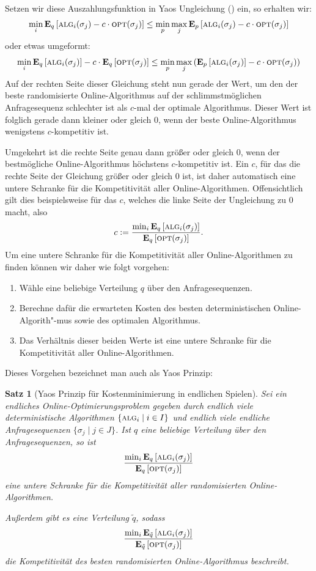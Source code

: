\documentclass[a4paper,ngerman,12pt,bibtotoc]{scrartcl}
\theoremstyle{definition}
\theoremstyle{plain}
\newtheorem{satz}[defn]{Satz}
\theoremstyle{remark}
\renewcommand{\_}{\mathpunct{.}\,}
\newcommand{\?}{\,{:}\,}
\newcommand{\Alg}{\ensuremath{\textsc{alg}}}
\newcommand{\Opt}{\ensuremath{\textsc{opt}}}
\newcommand{\EE}{\mathbf{E}}
\newcommand{\sq}{\tilde{q}}		%
\begin{document}
	Setzen wir diese Auszahlungsfunktion in Yaos Ungleichung () ein, so erhalten wir:
		\[\min_i\EE_q\left[\Alg_i(\sigma_j) - c\cdot\Opt(\sigma_j)\right] \leq \min_p\max_j\EE_{p}\left[\Alg_i(\sigma_j) - c\cdot\Opt(\sigma_j)\right]\]
	oder etwas umgeformt:
		\[\min_i\EE_q\left[\Alg_i(\sigma_j)\right] - c\cdot\EE_q\left[\Opt(\sigma_j)\right] \leq \min_p\max_j\left(\EE_{p}\left[\Alg_i(\sigma_j)\right] - c\cdot\Opt(\sigma_j)\right)\]
	Auf der rechten Seite dieser Gleichung steht nun gerade der Wert, um den der beste randomisierte Online-Algorithmus auf der schlimmstmöglichen Anfragesequenz schlechter ist als $c$-mal der optimale Algorithmus. Dieser Wert ist folglich gerade dann kleiner oder gleich 0, wenn der beste Online-Algorithmus wenigstens $c$-kompetitiv ist.
	
	Umgekehrt ist die rechte Seite genau dann größer oder gleich 0, wenn der bestmögliche Online-Algorithmus höchstens $c$-kompetitiv ist. Ein $c$, für das die rechte Seite der Gleichung größer oder gleich 0 ist, ist daher automatisch eine untere Schranke für die Kompetitivität aller Online-Algorithmen. Offensichtlich gilt dies beispielsweise für das $c$, welches die linke Seite der Ungleichung zu 0 macht, also
		\[c := \frac{\min_i\EE_q\left[\Alg_i(\sigma_j)\right]}{\EE_q\left[\Opt(\sigma_j)\right]}.\]
	Um eine untere Schranke für die Kompetitivität aller Online-Algorithmen zu finden können wir daher wie folgt vorgehen:
	\begin{enumerate}
		\item Wähle eine beliebige Verteilung $q$ über den Anfragesequenzen.
		\item Berechne dafür die erwarteten Kosten des besten deterministischen Online-Algorith"-mus sowie des optimalen Algorithmus.
		\item Das Verhältnis dieser beiden Werte ist eine untere Schranke für die Kompetitivität aller Online-Algorithmen.
	\end{enumerate}
	
	Dieses Vorgehen bezeichnet man auch als Yaos Prinzip:
	
	\begin{satz}[Yaos Prinzip für Kostenminimierung in endlichen Spielen]
		Sei ein endliches Online-Optimierungsproblem gegeben durch endlich viele deterministische Algorithmen $\{\Alg_i \mid i\in I\}$ und endlich viele endliche Anfragesequenzen $\{\sigma_j \mid j \in J\}$. Ist $q$ eine beliebige Verteilung über den Anfragesequenzen, so ist 
			\[\frac{\min_i\EE_q\left[\Alg_i(\sigma_j)\right]}{\EE_q\left[\Opt(\sigma_j)\right]}\]
		eine untere Schranke für die Kompetitivität aller randomisierten Online-Algorithmen.
		
		Außerdem gibt es eine Verteilung $\sq$, sodass 
			\[\frac{\min_i\EE_{\sq}\left[\Alg_i(\sigma_j)\right]}{\EE_{\sq}\left[\Opt(\sigma_j)\right]}\]
		die Kompetitivität des besten randomisierten Online-Algorithmus beschreibt.
	\end{satz}
	
\end{document}
